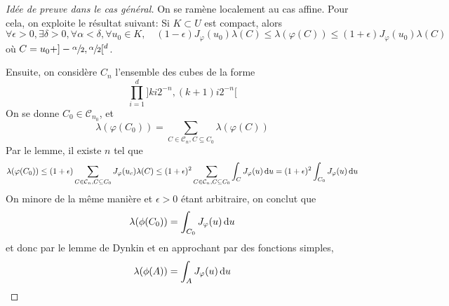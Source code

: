 \begin{proof}[Idée de preuve dans le cas général]
On se ramène localement au cas affine. Pour cela, on exploite le résultat suivant: Si $K\subset U$ est compact, alors \[
    \forall  \epsilon>0, \exists  \delta>0, \forall  \alpha<\delta, \forall  u_0 \in  K, \quad (1-\epsilon)J_{\varphi}(u_0) \lambda(C)\leq \lambda(\varphi(C))\leq (1+\epsilon)J_{\varphi}(u_0)\lambda(C)
\] 
où $C = u_0+]-\sfrac\alpha2,\sfrac\alpha2[^d$.

Ensuite, on considère $C_n$ l'ensemble des cubes de la forme  \[
\prod_{i=1}^d ]ki 2^{-n}, (k+1)i2^{-n}[
\] 
On se donne $C_0 \in  \mathcal  C_{n_0}$, et \[
 \lambda(\varphi(C_0))=\sum_{C\in \mathcal{C}_n, C\subseteq C_0} \lambda(\varphi(C))
\] 
Par le lemme, il existe $n$ tel que  \[
\lambda(\varphi(C_0)) \leq (1+\epsilon) \sum_{C\in \mathcal{C}_n, C\subseteq C_0} J_{\varphi}(u_c)\lambda(C) \leq (1+\epsilon)^2 \sum_{C\in \mathcal{C}_n,C\subseteq C_0} \int_C J_\varphi(u)\mathop{}\!\mathrm d u = (1+\epsilon)^2 \int_{C_0} J_\varphi(u)\mathop{}\!\mathrm d u
\] 
On minore de la même manière et $\epsilon>0$ étant arbitraire, on conclut que \[
\lambda(\phi(C_0))= \int_{C_0} J_\varphi(u)\mathop{}\!\mathrm d u
\] 
et donc par le lemme de Dynkin et en approchant par des fonctions simples, \[
\lambda(\phi(A))= \int_AJ_{\varphi}(u)\mathop{}\!\mathrm d u
\] 
\end{proof}
